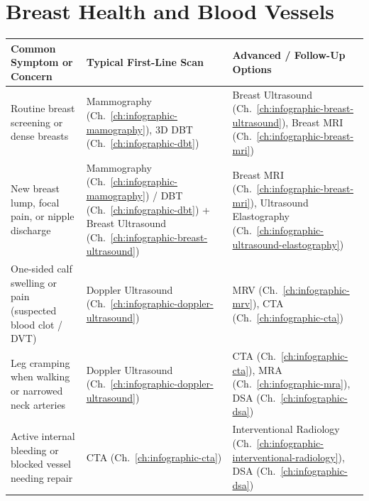 \section{Breast Health and Blood Vessels}
{\renewcommand{\arraystretch}{1.25}\noindent
\begin{tabularx}{\textwidth}{@{}p{} p{} X@{}}
\toprule
\textbf{Common Symptom or Concern} & \textbf{Typical First-Line Scan} & \textbf{Advanced / Follow-Up Options} \\
\midrule
Routine breast screening or dense breasts & Mammography (Ch.~\ref{ch:infographic-mamography}), 3D DBT (Ch.~\ref{ch:infographic-dbt}) & Breast Ultrasound (Ch.~\ref{ch:infographic-breast-ultrasound}), Breast MRI (Ch.~\ref{ch:infographic-breast-mri}) \\
New breast lump, focal pain, or nipple discharge & Mammography (Ch.~\ref{ch:infographic-mamography}) / DBT (Ch.~\ref{ch:infographic-dbt}) + Breast Ultrasound (Ch.~\ref{ch:infographic-breast-ultrasound}) & Breast MRI (Ch.~\ref{ch:infographic-breast-mri}), Ultrasound Elastography (Ch.~\ref{ch:infographic-ultrasound-elastography}) \\
One-sided calf swelling or pain (suspected blood clot / DVT) & Doppler Ultrasound (Ch.~\ref{ch:infographic-doppler-ultrasound}) & MRV (Ch.~\ref{ch:infographic-mrv}), CTA (Ch.~\ref{ch:infographic-cta}) \\
Leg cramping when walking or narrowed neck arteries & Doppler Ultrasound (Ch.~\ref{ch:infographic-doppler-ultrasound}) & CTA (Ch.~\ref{ch:infographic-cta}), MRA (Ch.~\ref{ch:infographic-mra}), DSA (Ch.~\ref{ch:infographic-dsa}) \\
Active internal bleeding or blocked vessel needing repair & CTA (Ch.~\ref{ch:infographic-cta}) & Interventional Radiology (Ch.~\ref{ch:infographic-interventional-radiology}), DSA (Ch.~\ref{ch:infographic-dsa}) \\
\bottomrule
\end{tabularx}}

